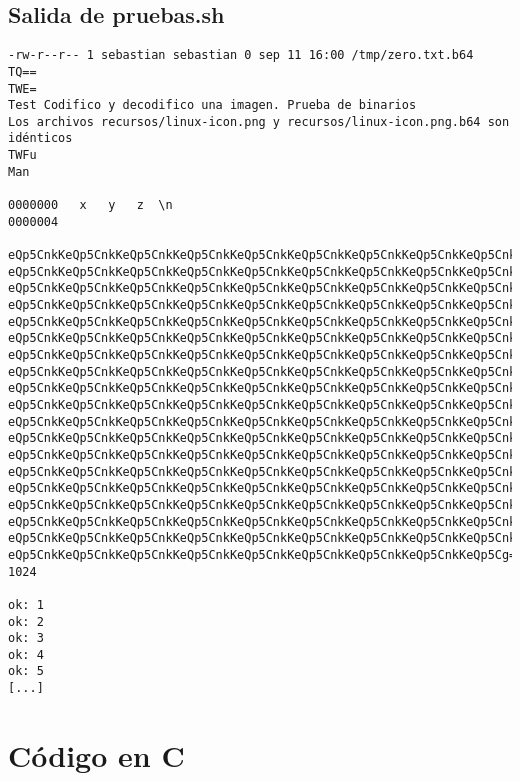 \documentclass{article}
\begin{document}
\subsection{Salida de pruebas.sh}
\begin{verbatim}
-rw-r--r-- 1 sebastian sebastian 0 sep 11 16:00 /tmp/zero.txt.b64
TQ==
TWE=
Test Codifico y decodifico una imagen. Prueba de binarios
Los archivos recursos/linux-icon.png y recursos/linux-icon.png.b64 son idénticos
TWFu
Man

0000000   x   y   z  \n
0000004

eQp5CnkKeQp5CnkKeQp5CnkKeQp5CnkKeQp5CnkKeQp5CnkKeQp5CnkKeQp5CnkKeQp5CnkK
eQp5CnkKeQp5CnkKeQp5CnkKeQp5CnkKeQp5CnkKeQp5CnkKeQp5CnkKeQp5CnkKeQp5CnkK
eQp5CnkKeQp5CnkKeQp5CnkKeQp5CnkKeQp5CnkKeQp5CnkKeQp5CnkKeQp5CnkKeQp5CnkK
eQp5CnkKeQp5CnkKeQp5CnkKeQp5CnkKeQp5CnkKeQp5CnkKeQp5CnkKeQp5CnkKeQp5CnkK
eQp5CnkKeQp5CnkKeQp5CnkKeQp5CnkKeQp5CnkKeQp5CnkKeQp5CnkKeQp5CnkKeQp5CnkK
eQp5CnkKeQp5CnkKeQp5CnkKeQp5CnkKeQp5CnkKeQp5CnkKeQp5CnkKeQp5CnkKeQp5CnkK
eQp5CnkKeQp5CnkKeQp5CnkKeQp5CnkKeQp5CnkKeQp5CnkKeQp5CnkKeQp5CnkKeQp5CnkK
eQp5CnkKeQp5CnkKeQp5CnkKeQp5CnkKeQp5CnkKeQp5CnkKeQp5CnkKeQp5CnkKeQp5CnkK
eQp5CnkKeQp5CnkKeQp5CnkKeQp5CnkKeQp5CnkKeQp5CnkKeQp5CnkKeQp5CnkKeQp5CnkK
eQp5CnkKeQp5CnkKeQp5CnkKeQp5CnkKeQp5CnkKeQp5CnkKeQp5CnkKeQp5CnkKeQp5CnkK
eQp5CnkKeQp5CnkKeQp5CnkKeQp5CnkKeQp5CnkKeQp5CnkKeQp5CnkKeQp5CnkKeQp5CnkK
eQp5CnkKeQp5CnkKeQp5CnkKeQp5CnkKeQp5CnkKeQp5CnkKeQp5CnkKeQp5CnkKeQp5CnkK
eQp5CnkKeQp5CnkKeQp5CnkKeQp5CnkKeQp5CnkKeQp5CnkKeQp5CnkKeQp5CnkKeQp5CnkK
eQp5CnkKeQp5CnkKeQp5CnkKeQp5CnkKeQp5CnkKeQp5CnkKeQp5CnkKeQp5CnkKeQp5CnkK
eQp5CnkKeQp5CnkKeQp5CnkKeQp5CnkKeQp5CnkKeQp5CnkKeQp5CnkKeQp5CnkKeQp5CnkK
eQp5CnkKeQp5CnkKeQp5CnkKeQp5CnkKeQp5CnkKeQp5CnkKeQp5CnkKeQp5CnkKeQp5CnkK
eQp5CnkKeQp5CnkKeQp5CnkKeQp5CnkKeQp5CnkKeQp5CnkKeQp5CnkKeQp5CnkKeQp5CnkK
eQp5CnkKeQp5CnkKeQp5CnkKeQp5CnkKeQp5CnkKeQp5CnkKeQp5CnkKeQp5CnkKeQp5CnkK
eQp5CnkKeQp5CnkKeQp5CnkKeQp5CnkKeQp5CnkKeQp5CnkKeQp5CnkKeQp5CnkKeQp5Cg==
1024

ok: 1
ok: 2
ok: 3
ok: 4
ok: 5
[...]
\end{verbatim}

\section{Código en C}
\end{document}
